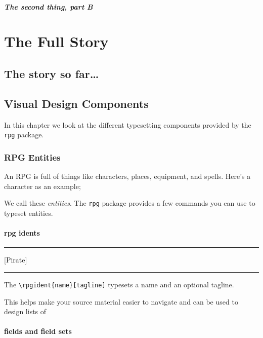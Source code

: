 \lipsum[5]

\subsubsection{The second thing, part B}

\lipsum[6-9]

\part{The Full Story}

\chapter{The story so far\ldots}



\chapter{Visual Design Components}

In this chapter we look at the different typesetting components provided by the \texttt{rpg} package.

\section{RPG Entities}

An RPG is full of things like characters, places, equipment, and spells. Here's a character as an example;

\rpgdoublevskip

\rpgdoublevskip

We call these \emph{entities}. The \texttt{rpg} package provides a few commands you can use to typeset entities.

\subsection{rpg idents}

\rpgvskip
\hrule
\rpgvskip
{}[Pirate]
\rpgdoublevskip
\hrule
\rpgvskip

The \verb|\rpgident{name}[tagline]| typesets a name and an optional tagline.

This helps make your source material easier to navigate and can be used to design lists of

\subsection{fields and field sets}

